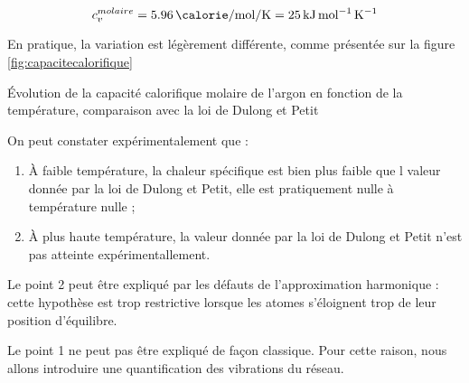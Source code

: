 \begin{equation}
    c_v^{molaire} = \SI{5.96}{\calorie\per\mol\per\kelvin} = \SI{25}{\kilo\joule\per\mol\per\kelvin}
\end{equation}

En pratique, la variation est légèrement différente, comme présentée sur la
figure \ref{fig:capacitecalorifique}

\begin{marginfigure}
    \TODO
    \caption{Évolution de la capacité calorifique molaire de l'argon en fonction de la température, comparaison avec la loi de Dulong et Petit}
    \label{fig:capacitecalorifique}
\end{marginfigure}

On peut constater expérimentalement que :
\begin{enumerate}
    \item À faible température, la chaleur spécifique est bien plus faible que l valeur donnée par la loi de Dulong et Petit, elle est
        pratiquement nulle à température nulle ;
    \item À plus haute température, la valeur donnée par la loi de Dulong et Petit n'est pas atteinte expérimentallement.
\end{enumerate}

Le point 2 peut être expliqué par les défauts de l'approximation harmonique :
cette hypothèse est trop restrictive lorsque les atomes s'éloignent trop de leur
position d'équilibre.

Le point 1 ne peut pas être expliqué de façon classique. Pour cette raison, nous
allons introduire une quantification des vibrations du réseau.


